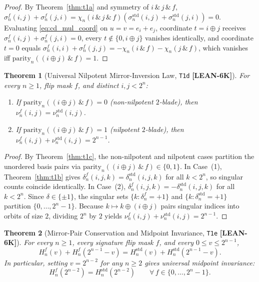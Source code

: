 \documentclass[11pt,reqno]{amsart}
\theoremstyle{plain}
\newtheorem{theorem}{Theorem}[section]
\theoremstyle{definition}
\theoremstyle{remark}
\newcommand{\tagLean}{\mbox{\textsf{\textbf{\color{oiBlue}[LEAN-6K]}}}}
\newcommand{\std}{\mathrm{std}}
\newcommand{\parbit}{\mathrm{parity}}
\begin{document}
\begin{proof}
By Theorem~\ref{thm:t1a} and symmetry of $i \,\&\, j \,\&\, f$,
$\sigma_n^{f}(i, j) + \sigma_n^{f}(j, i) = \chi_n(i \,\&\, j \,\&\, f)(\sigma_n^{\std}(i, j) + \sigma_n^{\std}(j, i)) = 0$.
Evaluating \eqref{eq:cd_mul_coord} on $u = v = e_i + e_j$, coordinate $t = i \oplus j$ receives
$\sigma_n^{f}(i, j) + \sigma_n^{f}(j, i) = 0$, every $t \notin \{0, i \oplus j\}$ vanishes
identically, and coordinate $t = 0$ equals
$\sigma_n^{f}(i, i) + \sigma_n^{f}(j, j) = -\chi_n(i \,\&\, f) - \chi_n(j \,\&\, f)$,
which vanishes iff $\parbit_n((i \oplus j) \,\&\, f) = 1$.
\end{proof}

\begin{theorem}[Universal Nilpotent Mirror-Inversion Law, \texttt{T1d} \tagLean]
\label{thm:t1d}
For every $n \ge 1$, flip mask $f$, and distinct $i, j < 2^n$:
\begin{enumerate}[leftmargin=2em]
  \item If $\parbit_n((i \oplus j) \,\&\, f) = 0$ (non-nilpotent $2$-blade), then
    $\nu_n^{f}(i, j) = \nu_n^{\std}(i, j)$.
  \item If $\parbit_n((i \oplus j) \,\&\, f) = 1$ (nilpotent $2$-blade), then
    $\nu_n^{f}(i, j) + \nu_n^{\std}(i, j) = 2^{n-1}$.
\end{enumerate}
\end{theorem}

\begin{proof}
By Theorem~\ref{thm:t1c}, the non-nilpotent and nilpotent cases partition the unordered basis pairs
via $\parbit_n((i \oplus j) \,\&\, f) \in \{0, 1\}$.
In Case~(1), Theorem~\ref{thm:t1b} gives $\delta_n^{f}(i, j, k) = \delta_n^{\std}(i, j, k)$ for
all $k < 2^n$, so singular counts coincide identically.
In Case~(2), $\delta_n^{f}(i, j, k) = -\delta_n^{\std}(i, j, k)$ for all $k < 2^n$. Since
$\delta \in \{\pm 1\}$, the singular sets $\{k : \delta_n^{f} = +1\}$ and
$\{k : \delta_n^{\std} = +1\}$ partition $\{0, \dots, 2^n-1\}$. Because $k \mapsto k \oplus (i\oplus j)$
pairs singular indices into orbits of size $2$, dividing $2^n$ by $2$ yields
$\nu_n^{f}(i, j) + \nu_n^{\std}(i, j) = 2^{n-1}$.
\end{proof}

\begin{theorem}[Mirror-Pair Conservation and Midpoint Invariance, \texttt{T1e} \tagLean]
\label{thm:t1e}
For every $n \ge 1$, every signature flip mask $f$, and every $0 \le v \le 2^{n-1}$,
\begin{equation}
\label{eq:mirror_conservation}
  H_n^{f}(v) + H_n^{f}(2^{n-1} - v) = H_n^{\std}(v) + H_n^{\std}(2^{n-1} - v).
\end{equation}
In particular, setting $v = 2^{n-2}$ for any $n \ge 2$ gives universal midpoint invariance:
\begin{equation}
  H_n^{f}(2^{n-2}) = H_n^{\std}(2^{n-2}) \qquad \forall\, f \in \{0, \dots, 2^n-1\}.
\end{equation}
\end{theorem}
\end{document}
